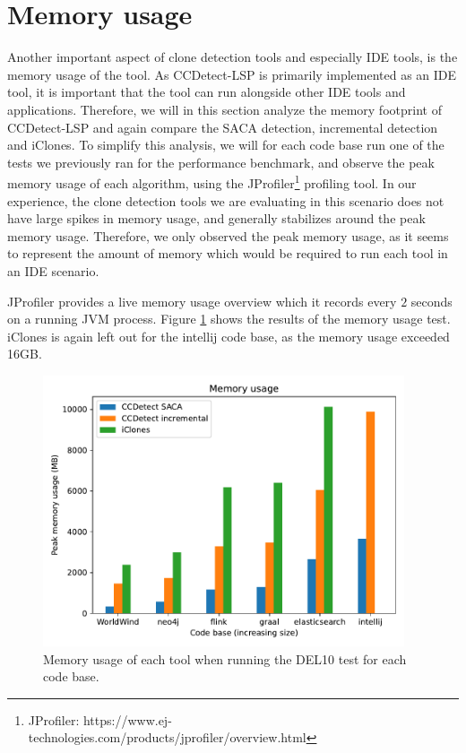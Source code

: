 \section{Memory usage}

Another important aspect of clone detection tools and especially IDE tools, is the memory
usage of the tool. As CCDetect-LSP is primarily implemented as an IDE tool, it is
important that the tool can run alongside other IDE tools and applications. Therefore, we
will in this section analyze the memory footprint of CCDetect-LSP and again compare the
SACA detection, incremental detection and iClones. To simplify this analysis, we will for
each code base run one of the tests we previously ran for the performance benchmark, and
observe the peak memory usage of each algorithm, using the JProfiler\footnote{JProfiler:
https://www.ej-technologies.com/products/jprofiler/overview.html} profiling tool. In our
experience, the clone detection tools we are evaluating in this scenario does not have
large spikes in memory usage, and generally stabilizes around the peak memory usage.
Therefore, we only observed the peak memory usage, as it seems to represent the amount of
memory which would be required to run each tool in an IDE scenario.

JProfiler provides a live memory usage overview which it records every $2$ seconds on a
running JVM process. Figure \ref{fig:memoryusage} shows the results of the memory usage
test. iClones is again left out for the intellij code base, as the memory usage exceeded
16GB.

\begin{figure}[t]
    \begin{center}
        \includegraphics[width=0.95\textwidth]{figures/memoryusage.pdf}
    \end{center}
    \caption{Memory usage of each tool when running the DEL10 test for each code base.}
    \label{fig:memoryusage}
\end{figure}
